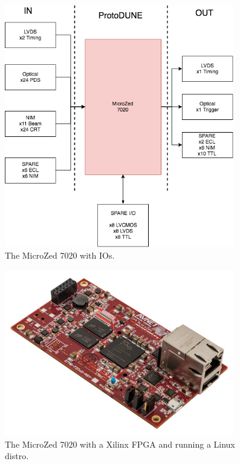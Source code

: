 \documentclass{report}
\begin{document}
 \begin{figure}[H]
     \centering
         \includegraphics[width=100mm]{ptbmk2_protdune_io.png}
         \caption{The MicroZed 7020 with IOs.}
 \end{figure}
 \begin{figure}[H]
     \centering
         \includegraphics[width=100mm]{mz_side_view.jpg}
         \caption{The MicroZed 7020 with a Xilinx FPGA and running a Linux distro.}
 \end{figure}
\end{document}
